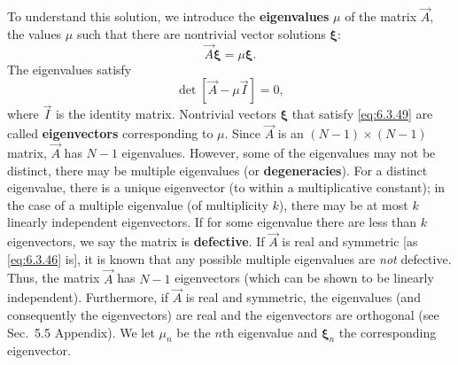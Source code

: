 To understand this solution, we introduce the \textbf{eigenvalues} $\mu$ of the matrix $\vec{A}$, the values $\mu$ such that there are nontrivial vector solutions $\boldsymbol{\xi}$:
\begin{equation}
\vec{A}\boldsymbol{\xi} = \mu\boldsymbol{\xi}.
\label{eq:6.3.49}
\end{equation}
The eigenvalues satisfy
\begin{equation}
\det[\vec{A} - \mu\vec{I}] = 0,
\label{eq:6.3.50}
\end{equation}
where $\vec{I}$ is the identity matrix.  Nontrivial vectors $\boldsymbol{\xi}$ that satisfy \eqref{eq:6.3.49} are called \textbf{eigenvectors} corresponding to $\mu$.  Since $\vec{A}$ is an $(N-1)\times(N-1)$ matrix, $\vec{A}$ has $N-1$ eigenvalues.  However, some of the eigenvalues may not be distinct, there may be multiple eigenvalues (or \textbf{degeneracies}).  For a distinct eigenvalue, there is a unique eigenvector (to within a multiplicative constant); in the case of a multiple eigenvalue (of multiplicity $k$), there may be at most $k$ linearly independent eigenvectors.  If for some eigenvalue there are less than $k$ eigenvectors, we say the matrix is \textbf{defective}.  If $\vec{A}$ is real and symmetric [as \eqref{eq:6.3.46} is], it is known that any possible multiple eigenvalues are \emph{not} defective.  Thus, the matrix $\vec{A}$ has $N-1$ eigenvectors (which can be shown to be linearly independent).  Furthermore, if $\vec{A}$ is real and symmetric, the eigenvalues (and consequently the eigenvectors) are real and the eigenvectors are orthogonal (see Sec.~5.5 Appendix).  We let $\mu_n$ be the $n$th eigenvalue and $\boldsymbol{\xi}_n$ the corresponding eigenvector.

